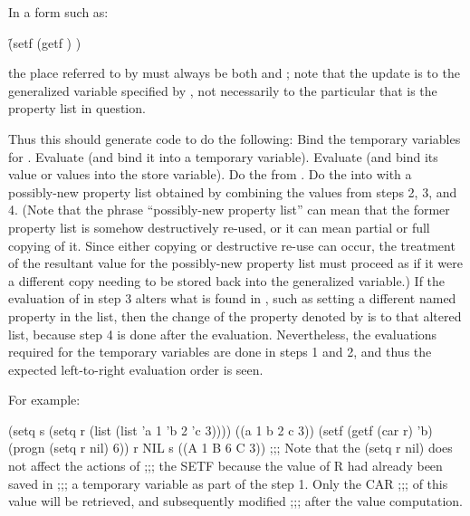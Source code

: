  
    In a form such as:
 
\f{(setf (getf  ) )}
 
    the place referred to by  must always be both 
    and ;  note that the update is to the generalized variable 
    specified by , not necessarily to the particular 
that is the property list in question.
 
    Thus this  should generate code to do the following:
\beginlist
{} 
Bind the temporary variables for .
Evaluate  (and bind it into a temporary variable).
Evaluate  (and bind 
its value or values into the store variable).
Do the  from .
Do the  into  with a possibly-new property list
       obtained by combining the values from steps 2, 3, and 4.  
(Note that the phrase ``possibly-new property list'' can mean that 
    the former property list is somehow destructively re-used, or it can 
    mean partial or full copying of it.  
Since either copying or destructive re-use can occur, 
the treatment of the resultant value for the 
    possibly-new property list must proceed as if it were a different copy
    needing to be stored back into the generalized variable.)
\endlist 
    If the evaluation of  
in step 3 alters what is found in
, such as setting a different named property in the list,
    then the change of the property denoted by  
is to that 
    altered list, because step 4 is done after the 
    evaluation.  Nevertheless, the 
    evaluations required for  
the temporary variables  are done in steps 1 and 
    2,  and thus the expected left-to-right evaluation order is seen.

For example:

\code
 (setq s (setq r (list (list 'a 1 'b 2 'c 3)))) \EV ((a 1 b 2 c 3))
 (setf (getf (car r) 'b) 
       (progn (setq r nil) 6)) 
 r \EV NIL
 s \EV ((A 1 B 6 C 3))
;;; Note that the (setq r nil) does not affect the actions of 
;;; the SETF because the value of R had already been saved in 
;;; a temporary variable as part of the step 1. Only the CAR
;;; of this value will be retrieved, and subsequently modified 
;;; after the value computation.
\endcode
 
